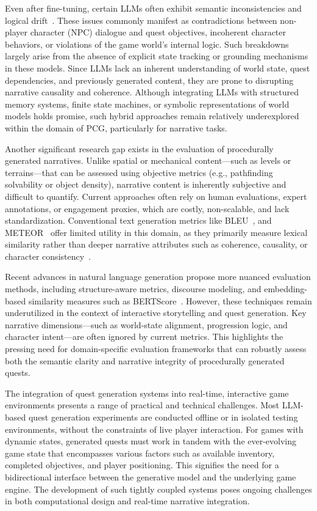 Even after fine-tuning, certain LLMs often exhibit semantic inconsistencies and logical
drift~\cite{luo2023empirical,huang2025survey}. These issues commonly manifest as contradictions between non-player
character (NPC) dialogue and quest objectives, incoherent character behaviors, or violations
of the game world's internal logic. Such breakdowns largely arise from the absence
of explicit state tracking or grounding mechanisms in these models. Since LLMs lack an
inherent understanding of world state, quest dependencies, and previously generated content,
they are prone to disrupting narrative causality and coherence. Although integrating
LLMs with structured memory systems, finite state machines, or symbolic representations
of world models holds promise, such hybrid approaches remain relatively underexplored
within the domain of PCG, particularly for narrative tasks.

Another significant research gap exists in the evaluation of procedurally generated
narratives. Unlike spatial or mechanical content—such as levels or terrains—that can be
assessed using objective metrics (e.g., pathfinding solvability or object density), narrative
content is inherently subjective and difficult to quantify. Current approaches often rely
on human evaluations, expert annotations, or engagement proxies, which are costly, non-scalable,
and lack standardization. Conventional text generation metrics like BLEU~\cite{papineni02bleu},
and METEOR~\cite{banarjee2005} offer limited utility in this domain, as they primarily measure lexical
similarity rather than deeper narrative attributes such as coherence, causality, or character
consistency~\cite{celikyilmaz2020evaluation}.

Recent advances in natural language generation propose more nuanced evaluation
methods, including structure-aware metrics, discourse modeling, and embedding-based
similarity measures such as BERTScore~\cite{zhang2019bertscore}. However, these techniques remain underutilized
in the context of interactive storytelling and quest generation. Key narrative
dimensions—such as world-state alignment, progression logic, and character intent—are
often ignored by current metrics. This highlights the pressing need for domain-specific
evaluation frameworks that can robustly assess both the semantic clarity and narrative
integrity of procedurally generated quests.

The integration of quest generation systems into real-time, interactive game environments
presents a range of practical and technical challenges. Most LLM-based quest
generation experiments are conducted offline or in isolated testing environments, without
the constraints of live player interaction. For games with dynamic states, generated quests
must work in tandem with the ever-evolving game state that encompasses various factors
such as available inventory, completed objectives, and player positioning. This signifies
the need for a bidirectional interface between the generative model and the underlying
game engine. The development of such tightly coupled systems poses ongoing challenges
in both computational design and real-time narrative integration.


